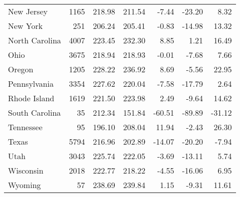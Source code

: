 \begin{table}[ht]
\begin{center}
\begin{tabular}{lrrrrrr}
  New Jersey & 1165 & 218.98 & 211.54 & -7.44 & -23.20 & 8.32 \\ 
  New York & 251 & 206.24 & 205.41 & -0.83 & -14.98 & 13.32 \\ 
  North Carolina & 4007 & 223.45 & 232.30 & 8.85 & 1.21 & 16.49 \\ 
  Ohio & 3675 & 218.94 & 218.93 & -0.01 & -7.68 & 7.66 \\ 
  Oregon & 1205 & 228.22 & 236.92 & 8.69 & -5.56 & 22.95 \\ 
  Pennsylvania & 3354 & 227.62 & 220.04 & -7.58 & -17.79 & 2.64 \\ 
  Rhode Island & 1619 & 221.50 & 223.98 & 2.49 & -9.64 & 14.62 \\ 
  South Carolina &  35 & 212.34 & 151.84 & -60.51 & -89.89 & -31.12 \\ 
  Tennessee &  95 & 196.10 & 208.04 & 11.94 & -2.43 & 26.30 \\ 
  Texas & 5794 & 216.96 & 202.89 & -14.07 & -20.20 & -7.94 \\ 
  Utah & 3043 & 225.74 & 222.05 & -3.69 & -13.11 & 5.74 \\ 
  Wisconsin & 2018 & 222.77 & 218.22 & -4.55 & -16.06 & 6.95 \\ 
  Wyoming &  57 & 238.69 & 239.84 & 1.15 & -9.31 & 11.61 \\ 
   \hline
\end{tabular}
\end{center}
\end{table}
